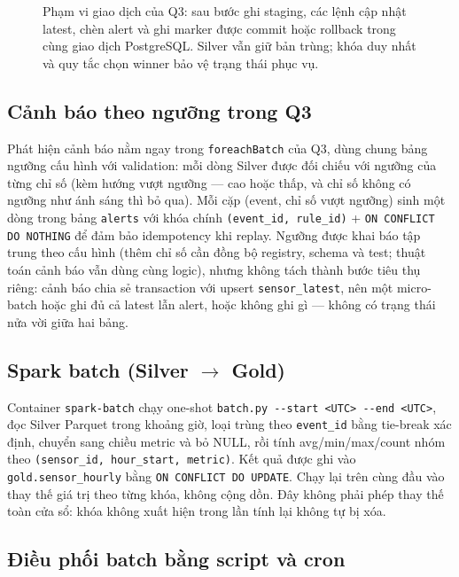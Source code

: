 \begin{figure}[H]
\centering

\caption[Phạm vi giao dịch và khóa duy nhất trong Q3.]{Phạm vi giao dịch của
Q3: sau bước ghi staging, các lệnh cập nhật latest, chèn alert và ghi marker
được commit hoặc rollback trong cùng giao dịch PostgreSQL. Silver vẫn giữ
bản trùng; khóa duy nhất và quy tắc chọn winner bảo vệ trạng thái phục vụ.}
\label{fig:q3-transaction}
\end{figure}

\subsection{Cảnh báo theo ngưỡng trong Q3}
\label{subsec:alert-q3}

Phát hiện cảnh báo nằm ngay trong \texttt{foreachBatch} của Q3, dùng chung
bảng ngưỡng cấu hình với validation: mỗi dòng Silver được đối chiếu với
ngưỡng của từng chỉ số (kèm hướng vượt ngưỡng --- cao hoặc thấp, và chỉ số
không có ngưỡng như ánh sáng thì bỏ qua). Mỗi cặp (event, chỉ số vượt
ngưỡng) sinh một dòng trong bảng \texttt{alerts} với khóa chính
\texttt{(event\_id, rule\_id)} + \texttt{ON CONFLICT DO NOTHING} để đảm bảo
idempotency khi replay. Ngưỡng được khai báo tập trung theo cấu hình (thêm chỉ số cần đồng bộ
registry, schema và test; thuật toán cảnh báo vẫn dùng cùng logic), nhưng không tách thành
bước tiêu thụ riêng: cảnh báo chia sẻ transaction với upsert
\texttt{sensor\_latest}, nên một micro-batch hoặc ghi đủ cả latest lẫn alert,
hoặc không ghi gì --- không có trạng thái nửa vời giữa hai bảng.

\subsection{Spark batch (Silver \texorpdfstring{$\rightarrow$}{sang} Gold)}

Container \texttt{spark-batch} chạy one-shot \texttt{batch.py -{}-start <UTC>
-{}-end <UTC>}, đọc Silver Parquet trong khoảng giờ, loại trùng theo
\texttt{event\_id} bằng tie-break xác định, chuyển sang chiều metric và bỏ
NULL, rồi tính avg/min/max/count nhóm theo
\texttt{(sensor\_id, hour\_start, metric)}. Kết quả được ghi vào \texttt{gold.sensor\_hourly} bằng
\texttt{ON CONFLICT DO UPDATE}. Chạy lại trên cùng đầu vào thay thế giá trị
theo từng khóa, không cộng dồn. Đây không phải phép thay thế toàn cửa sổ:
khóa không xuất hiện trong lần tính lại không tự bị xóa.

\subsection{Điều phối batch bằng script và cron}

